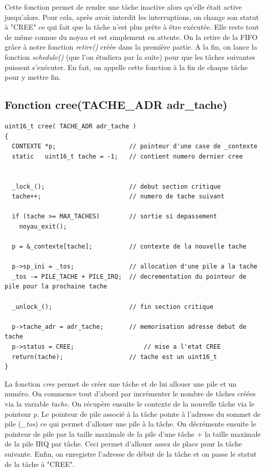 \documentclass[a4paper,12pt]{report}
\begin{document}
Cette fonction permet de rendre une tâche inactive alors qu'elle était active jusqu'alors. Pour cela, après avoir interdit les interruptions, on change son statut à "CREE" ce qui fait que la tâche n'est plus prête à être exécutée. Elle reste tout de même connue du noyau et est simplement en attente. On la retire de la FIFO grâce à notre fonction \textit{retire()} créée dans la première partie. A la fin, on lance la fonction \textit{schedule()} (que l'on étudiera par la suite) pour que les tâches suivantes puissent s'exécuter. En fait, on appelle cette fonction à la fin de chaque tâche pour y mettre fin.

\subsection{Fonction cree(TACHE\_ADR adr\_tache)}
\begin{lstlisting}
uint16_t cree( TACHE_ADR adr_tache )
{
  CONTEXTE *p;                    // pointeur d'une case de _contexte 
  static   uint16_t tache = -1;   // contient numero dernier cree 


  _lock_();                       // debut section critique 
  tache++;                        // numero de tache suivant 

  if (tache >= MAX_TACHES)        // sortie si depassement 
    noyau_exit();

  p = &_contexte[tache];          // contexte de la nouvelle tache 

  p->sp_ini = _tos;               // allocation d'une pile a la tache 
  _tos -= PILE_TACHE + PILE_IRQ;  // decrementation du pointeur de pile pour la prochaine tache

  _unlock_();                     // fin section critique 

  p->tache_adr = adr_tache;       // memorisation adresse debut de tache 
  p->status = CREE; 		          // mise a l'etat CREE 
  return(tache);                  // tache est un uint16_t 
}
\end{lstlisting}

La fonction \textit{cree} permet de créer une tâche et de lui allouer une pile et un numéro. On commence tout d'abord par incrémenter le nombre de tâches créées via la variable \textit{tache}. On récupère ensuite le contexte de la nouvelle tâche via le pointeur \textit{p}. Le pointeur de pile associé à la tâche pointe à l'adresse du sommet de pile (\textit{\_tos}) ce qui permet d'allouer une pile à la tâche. On décrémente ensuite le pointeur de pile par la taille maximale de la pile d'une tâche + la taille maximale de la pile IRQ par tâche. Ceci permet d'allouer assez de place pour la tâche suivante. Enfin, on enregistre l'adresse de début de la tâche et on passe le statut de la tâche à "CREE".	
\end{document}
